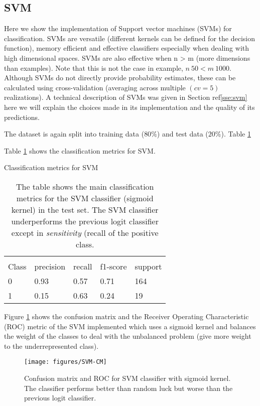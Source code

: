 \documentclass[11pt]{article}
\theoremstyle{definition}
\theoremstyle{remark}
\begin{document}
{\subsection{SVM}
\label{se:ressvm}
Here we show the implementation of Support vector machines (SVMs) for classification. SVMs are versatile (different kernels can be defined for the decision function), memory efficient and effective classifiers especially when dealing with high dimensional spaces. SVMs are also effective when n > m (more dimensions than examples). Note that this is not the case in example, $n~50 < m ~1000$.
Although SVMs do not directly provide probability estimates, these can be calculated using cross-validation (averaging across multiple $(cv=5)$ realizations).
A technical description of SVMs was given in Section ref\ref{sse:svm} here we will explain the choices made in its implementation and the quality of its predictions.

The dataset is again split into training data ($80\%$) and test data ($20\%$). Table \ref{tab:svm}

Table \ref{tab:svm} shows the classification metrics for SVM.
\begin{table}[H]
\caption{Classification metrics for SVM}
\begin{center} 
\begin{tabular}{lllll}
\hline
\multicolumn{1}{c}{} \\
Class & precision & recall & f1-score & support     \\
\hline
0 & 0.93  &    0.57   &   0.71   &    164 \\
1 & 0.15  &    0.63   &   0.24   &    19 \\
\hline
\end{tabular}
\caption{The table shows the main classification metrics for the SVM classifier (sigmoid kernel) in the test set. The SVM classifier underperforms the previous logit classifier except in \emph{sensitivity} (recall of the positive class.}  \label{tab:svm} 
\end{center}
\end{table}

Figure \ref{fig:svm-cm} shows the confusion matrix and the Receiver Operating Characteristic (ROC) metric of the SVM implemented which uses a sigmoid kernel and balances the weight of the classes to deal with the unbalanced problem (give more weight to the underrepresented class).
\begin{figure}[H]
        \centering
        \texttt{[image: figures/SVM-CM]}
        \caption{Confusion matrix and ROC for SVM classifier with sigmoid kernel. The classifier performs better than random luck but worse than the previous logit classifier.} \label{fig:svm-cm}
\end{figure}

}
\end{document}
